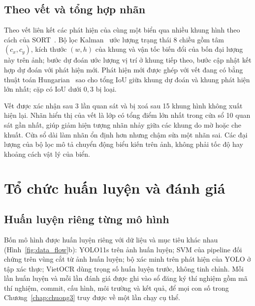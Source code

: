 \subsection{Theo vết và tổng hợp nhãn}
Theo vết liên kết các phát hiện của cùng một biển qua nhiều khung hình theo cách của SORT~\cite{bewley2016sort}. Bộ lọc Kalman~\cite{kalman1960filter} ước lượng trạng thái 8 chiều gồm tâm $(c_x,c_y)$, kích thước $(w,h)$ của khung và vận tốc biến đổi của bốn đại lượng này trên ảnh; bước dự đoán ước lượng vị trí ở khung tiếp theo, bước cập nhật kết hợp dự đoán với phát hiện mới. Phát hiện mới được ghép với vết đang có bằng thuật toán Hungarian~\cite{kuhn1955hungarian} sao cho tổng IoU giữa khung dự đoán và khung phát hiện lớn nhất; cặp có IoU dưới $0{,}3$ bị loại.

Vết được xác nhận sau 3 lần quan sát và bị xoá sau 15 khung hình không xuất hiện lại. Nhãn hiển thị của vết là lớp có tổng điểm lớn nhất trong cửa sổ 10 quan sát gần nhất, giúp giảm hiện tượng nhãn nhảy giữa các khung do mờ hoặc che khuất. Cửa sổ dài làm nhãn ổn định hơn nhưng chậm sửa một nhãn sai. Các đại lượng của bộ lọc mô tả chuyển động biểu kiến trên ảnh, không phải tốc độ hay khoảng cách vật lý của biển.

\section{Tổ chức huấn luyện và đánh giá}
\label{sec:protocol}

\subsection{Huấn luyện riêng từng mô hình}
Bốn mô hình được huấn luyện riêng với dữ liệu và mục tiêu khác nhau (Hình~\ref{fig:data_flow}b): YOLO11s trên ảnh huấn luyện; SVM của pipeline đối chứng trên vùng cắt từ ảnh huấn luyện; bộ xác minh trên phát hiện của YOLO ở tập xác thực; VietOCR dùng trọng số huấn luyện trước, không tinh chỉnh. Mỗi lần huấn luyện và mỗi lần đánh giá được ghi vào sổ đăng ký thí nghiệm gồm mã thí nghiệm, commit, cấu hình, môi trường và kết quả, để mọi con số trong Chương~\ref{chap:chuong3} truy được về một lần chạy cụ thể.

